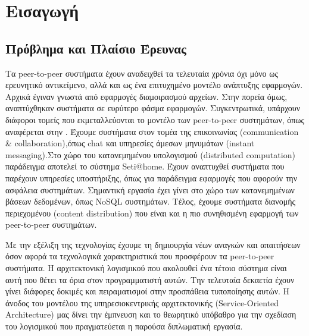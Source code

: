 \chapter{Εισαγωγή}
\label{chap:Intro}

\section{Πρόβλημα και Πλαίσιο Έρευνας}

Τα peer-to-peer συστήματα έχουν αναδειχθεί τα τελευταία χρόνια όχι μόνο 
ως ερευνητικό αντικείμενο, αλλά και ως ένα επιτυχημένο μοντέλο ανάπτυξης 
εφαρμογών. Αρχικά έγιναν γνωστά από εφαρμογές διαμοιρασμού αρχείων. Στην 
πορεία όμως, αναπτύχθηκαν συστήματα σε ευρύτερο φάσμα εφαρμογών. 
Συγκεντρωτικά, υπάρχουν διάφοροι τομείς που εκμεταλλεύονται το μοντέλο 
των peer-to-peer συστημάτων, όπως αναφέρεται στην 
\citep{Androutsellis-Theotokis2004}. Έχουμε συστήματα στον τομέα της 
επικοινωνίας (communication \& collaboration),όπως chat και υπηρεσίες 
άμεσων μηνυμάτων (instant messaging).Στο χώρο του κατανεμημένου 
υπολογισμού (distributed computation) παράδειγμα αποτελεί το σύστημα Seti@home. 
Έχουν αναπτυχθεί συστήματα που παρέχουν υπηρεσίες υποστήριξης, όπως για 
παράδειγμα εφαρμογές που αφορούν την ασφάλεια συστημάτων. Σημαντική 
εργασία έχει γίνει στο χώρο των κατανεμημένων βάσεων δεδομένων, όπως 
NoSQL συστημάτων. Τέλος, έχουμε συστήματα διανομής περιεχομένου (content 
distribution) που είναι και η πιο συνηθισμένη εφαρμογή των peer-to-peer 
συστημάτων.

Με την εξέλιξη της τεχνολογίας έχουμε τη δημιουργία νέων αναγκών και 
απαιτήσεων όσον αφορά τα τεχνολογικά χαρακτηριστικά που προσφέρουν τα 
peer-to-peer συστήματα. Η αρχιτεκτονική λογισμικού που ακολουθεί ένα 
τέτοιο σύστημα είναι αυτή που θέτει τα όρια στον προγραμματιστή αυτών. 
Την τελευταία δεκαετία έχουν γίνει διάφορες δοκιμές και πειραματισμοί 
στην προσπάθεια τυποποίησης αυτών. Η άνοδος του μοντέλου της 
υπηρεσιοκεντρικής αρχιτεκτονικής (Service-Oriented Architecture) μας 
δίνει την έμπνευση και το θεωρητικό υπόβαθρο για την σχεδίαση του 
λογισμικού που πραγματεύεται η παρούσα διπλωματική εργασία.

